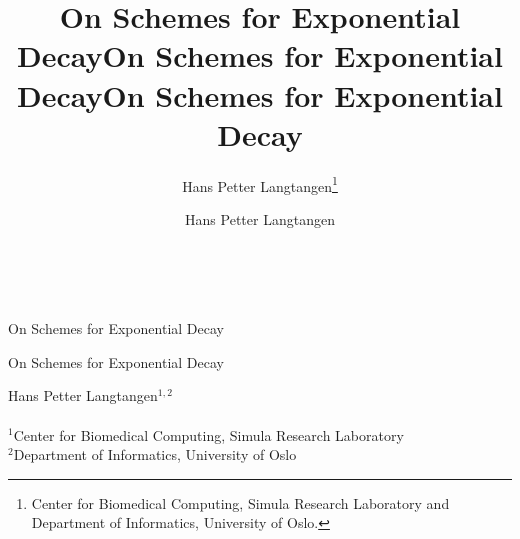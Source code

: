 \documentclass[%
oneside,                 %
final,                   %
10pt]{article}
\begin{document}







\title{On Schemes for Exponential Decay}


\thispagestyle{empty}
\hbox{\ \ }
\vfill
\begin{center}
{\huge{\bfseries{
\begin{spacing}{1.25}
On Schemes for Exponential Decay
\end{spacing}
}}}

\title*{On Schemes for Exponential Decay}

\title{On Schemes for Exponential Decay}
\begin{center}
{\LARGE\bf
\begin{spacing}{1.25}
On Schemes for Exponential Decay
\end{spacing}
}
\end{center}

\author{Hans Petter Langtangen\footnote{Center for Biomedical Computing, Simula Research Laboratory and Department of Informatics, University of Oslo.}}

\vspace{1.3cm}

    {\Large\textsf{Hans Petter Langtangen${}^{1, 2}$}}\\ [3mm]
    
\ \\ [2mm]

{\large\textsf{${}^1$Center for Biomedical Computing, Simula Research Laboratory} \\ [1.5mm]}
{\large\textsf{${}^2$Department of Informatics, University of Oslo} \\ [1.5mm]}

\author{Hans Petter Langtangen}


\end{center}
\end{document}
